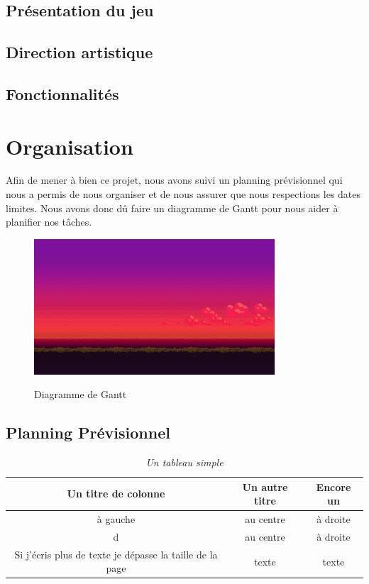 \documentclass[12pt,a4paper, twoside]{article}
\begin{document}
\subsection{Présentation du jeu}
\subsection{Direction artistique}
\subsection{Fonctionnalités}
\section{Organisation}

    Afin de mener à bien ce projet, nous avons suivi un planning prévisionnel qui nous a permis de nous organiser et de nous assurer que nous respections les dates limites. Nous avons donc dû faire un diagramme de Gantt pour nous aider à planifier nos tâches.
    \begin{figure}[h]
        \centering
        \includegraphics[width=0.8\textwidth]{../../assets/Title Screen/BG.jpg}
        \label{fig:GANTT}
        \caption{Diagramme de Gantt}
    \end{figure}
\subsection{Planning Prévisionnel}
\begin{table}[h]
    \centering
    \begin{tabular}{|c|c|c|}
        \hline
        Un titre de colonne & Un autre titre & Encore un \\
        \hline
        à gauche & au centre & à droite \\
        \hline
        d & au centre & à droite \\
        \hline
        Si j’écris plus de texte je dépasse la taille de la page & texte & texte \\
        \hline
    \end{tabular}
    \vspace{1cm}
    \caption{\emph{Un tableau simple}}
    \label{tab:test}
\end{table}
\end{document}
